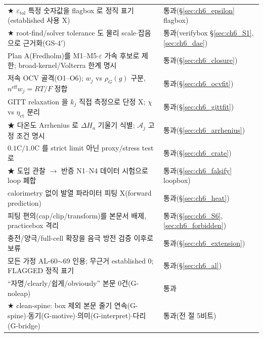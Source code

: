 \documentclass[11pt,a4paper]{article}
\newcommand{\eff}{\mathrm{eff}}
\newcommand{\ct}{\mathrm{ct}}
\newcommand{\tol}{\mathrm{tol}}
\begin{document}
{\begin{longtable}{p{} p{}}
★ $\varepsilon_\tol$ 특정 숫자값을 flagbox 로 정직 표기(established 사용 X) & 통과(\S\ref{sec:ch6_epsilon} flagbox) \\
★ root-find/solver tolerance 도 물리 scale$\cdot$잡음으로 근거화(GS-4$'$) & 통과(verifybox \S\ref{sec:ch6_S1},\ref{sec:ch6_dae}) \\
Plan A(Fredholm)를 M1--M5$\cdot\varepsilon$ 가속 후보로 제한; broad-kernel/Volterra 한계 명시 & 통과(\S\ref{sec:ch6_closure}) \\
저속 OCV 골격(O1--O6); $w_j$ vs $\rho_G(g)$ 구분, $n^{\eff}w_j=RT/F$ 정합 & 통과(\S\ref{sec:ch6_ocvfit}) \\
GITT relaxation 을 $k_j$ 직접 측정으로 단정 X; $\chi$ vs $\eta_\ct$ 분리 & 통과(\S\ref{sec:ch6_gittfit}) \\
★ 다온도 Arrhenius 로 $\Delta H_a$ 기울기 식별; $\mathcal A_j$ 고정 조건 명시 & 통과(\S\ref{sec:ch6_arrhenius}) \\
$0.1\mathrm C/1.0\mathrm C$ 를 strict limit 아닌 proxy/stress test 로 & 통과(\S\ref{sec:ch6_crate}) \\
★ 도입 관찰 $\to$ 반증 N1--N4 데이터 시험으로 loop 폐합 & 통과(\S\ref{sec:ch6_falsify} loopbox) \\
calorimetry 없이 발열 파라미터 피팅 X(forward prediction) & 통과(\S\ref{sec:ch6_heat}) \\
피팅 편의(cap/clip/transform)를 본문서 배제, practicebox 격리 & 통과(\S\ref{sec:ch6_S6},\ref{sec:ch6_forbidden}) \\
충전/양극/full-cell 확장을 음극 방전 검증 이후로 보류 & 통과(\S\ref{sec:ch6_extension}) \\
모든 가정 AL-60$\sim$69 인용; 무근거 established 0; FLAGGED 정직 표기 & 통과(\S\ref{sec:ch6_al}) \\
``자명/clearly/쉽게/obviously'' 본문 0건(G-noleap) & 통과 \\
★ clean-spine: box 제외 본문 줄기 연속(G-spine)$\cdot$동기(G-motive)$\cdot$의미(G-interpret)$\cdot$다리(G-bridge) & 통과(전 절 5비트) \\
\bottomrule
\end{longtable}
}

\end{document}
